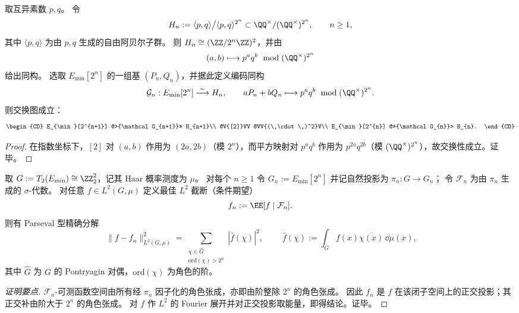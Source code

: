 \begin{proposition}\label{prop:conclusion-leyang-torsion-godel-kummer-coding}
取互异素数 \(p,q\)。
令
\[
H_n:=\langle p,q\rangle\big/\langle p,q\rangle^{2^n}\subset \QQ^\times/(\QQ^\times)^{2^n},
\qquad n\ge 1,
\]
其中 \(\langle p,q\rangle\) 为由 \(p,q\) 生成的自由阿贝尔子群。
则 \(H_n\cong (\ZZ/2^n\ZZ)^2\)，并由
\[
(a,b)\longmapsto p^a q^b\ \bmod (\QQ^\times)^{2^n}
\]
给出同构。
选取 \(E_{\min}[2^n]\) 的一组基 \((P_n,Q_n)\)，并据此定义编码同构
\[
\mathcal G_n:E_{\min}[2^n]\stackrel{\sim}{\longrightarrow}H_n,\qquad aP_n+bQ_n\longmapsto p^a q^b\ \bmod(\QQ^\times)^{2^n}.
\]
则交换图成立：
\[
\begin{CD}
E_{\min}[2^{n+1}] @>{\mathcal G_{n+1}}>> H_{n+1}\\
@V{[2]}VV @VV{(\,\cdot\,)^2}V\\
E_{\min}[2^{n}] @>>{\mathcal G_{n}}> H_{n}.
\end{CD}
\]
\end{proposition}
\begin{proof}
在指数坐标下，\([2]\) 对 \((a,b)\) 作用为 \((2a,2b)\)（模 \(2^n\)），而平方映射对 \(p^a q^b\) 作用为 \(p^{2a}q^{2b}\)（模 \((\QQ^\times)^{2^n}\)），故交换性成立。证毕。
\end{proof}

\begin{theorem}\label{thm:conclusion-leyang-t2-fourier-truncation-equals-precision}
取 \(G:=T_2(E_{\min})\cong \ZZ_2^2\)，记其 Haar 概率测度为 \(\mu\)。
对每个 \(n\ge 1\) 令 \(G_n:=E_{\min}[2^n]\) 并记自然投影为 \(\pi_n:G\to G_n\)；
令 \(\mathcal F_n\) 为由 \(\pi_n\) 生成的 \(\sigma\)-代数。
对任意 \(f\in L^2(G,\mu)\) 定义最佳 \(L^2\) 截断（条件期望）
\[
f_n:=\EE[f\mid \mathcal F_n].
\]
则有 Parseval 型精确分解
\[
\boxed{\;
\|f-f_n\|_{L^2(G,\mu)}^2
=\sum_{\substack{\chi\in \widehat G\\ \mathrm{ord}(\chi)>2^n}}|\widehat f(\chi)|^2,\;}
\qquad
\widehat f(\chi):=\int_G f(x)\overline{\chi(x)}\,\dd\mu(x),
\]
其中 \(\widehat G\) 为 \(G\) 的 Pontryagin 对偶，\(\mathrm{ord}(\chi)\) 为角色的阶。
\end{theorem}
\begin{proof}[证明要点]
\(\mathcal F_n\)-可测函数空间由所有经 \(\pi_n\) 因子化的角色张成，亦即由阶整除 \(2^n\) 的角色张成。
因此 \(f_n\) 是 \(f\) 在该闭子空间上的正交投影；其正交补由阶大于 \(2^n\) 的角色张成。
对 \(f\) 作 \(L^2\) 的 Fourier 展开并对正交投影取能量，即得结论。证毕。
\end{proof}

